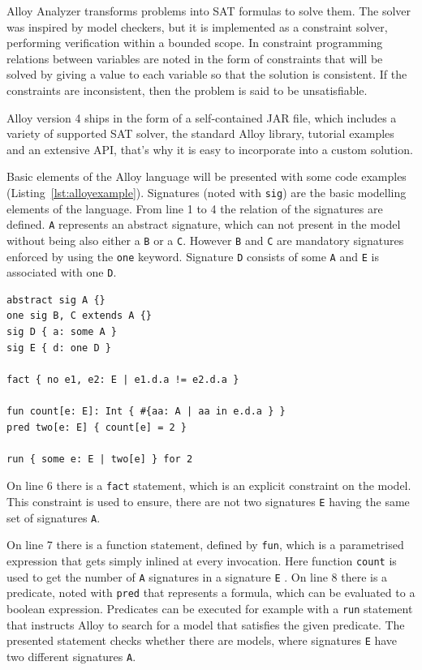 Alloy Analyzer transforms problems into SAT formulas to solve them. The solver was inspired by model checkers, but it is implemented as a constraint solver, performing verification within a bounded scope. In constraint programming relations between variables are noted in the form of constraints that will be solved by giving a value to each variable so that the solution is consistent. If the constraints are inconsistent, then the problem is said to be unsatisfiable.

Alloy version 4 ships in the form of a self-contained JAR file, which includes a variety of supported SAT solver, the standard Alloy library, tutorial examples and an extensive API, that's why it is easy to incorporate into a custom solution.

Basic elements of the Alloy language will be presented with some code examples (Listing~\ref{lst:alloyexample}). Signatures (noted with \texttt{sig}) are the basic modelling elements of the language. From line 1 to 4 the relation of the signatures are defined. \texttt{A} represents an abstract signature, which can not present in the model without being also either a \texttt{B} or a \texttt{C}. However \texttt{B} and \texttt{C} are mandatory signatures enforced by using the \texttt{one} keyword. Signature \texttt{D} consists of some \texttt{A} and \texttt{E} is associated with one \texttt{D}.

\begin{lstlisting}[label={lst:alloyexample}, caption=Example Alloy code,breaklines=true]
abstract sig A {}
one sig B, C extends A {}
sig D { a: some A }
sig E { d: one D }

fact { no e1, e2: E | e1.d.a != e2.d.a }

fun count[e: E]: Int { #{aa: A | aa in e.d.a } }
pred two[e: E] { count[e] = 2 }

run { some e: E | two[e] } for 2
\end{lstlisting}

On line 6 there is a \texttt{fact} statement, which is an explicit constraint on the model. This constraint is used to ensure, there are not two signatures \texttt{E} having the same set of signatures \texttt{A}. 

On line 7 there is a function statement, defined by \texttt{fun}, which is a parametrised expression that gets simply inlined at every invocation. Here function \texttt{count} is used to get the number of \texttt{A} signatures in a signature \texttt{E} . On line 8 there is a predicate, noted with \texttt{pred} that represents a formula, which can be evaluated to a boolean expression. Predicates can be executed for example with a \texttt{run} statement that instructs Alloy to search for a model that satisfies the given predicate. The presented statement checks whether there are models, where signatures \texttt{E} have two different signatures \texttt{A}.

